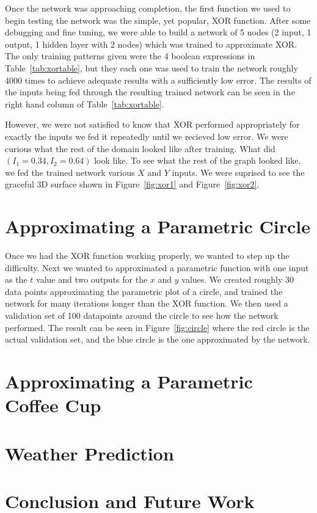 \documentclass{article}
\begin{document}
\begin{multicols}{2}
Once the network was approaching completion, the first function we used to begin testing the network was the simple, yet popular, XOR function. After some debugging and fine tuning, we were able to build a network of 5 nodes (2 input, 1 output, 1 hidden layer with 2 nodes) which was trained to approximate XOR. The only training patterns given were the 4 boolean expressions in Table~\ref{tab:xortable}, but they each one was used to train the network roughly 4000 times to achieve adequate results with a sufficiently low error. The results of the inputs being fed through the resulting trained network can be seen in the right hand column of Table~\ref{tab:xortable}.

However, we were not satisfied to know that XOR performed appropriately for exactly the inputs we fed it repeatedly until we recieved low error. We were curious what the rest of the domain looked like after training. What did $(I_1=0.34, I_2=0.64)$ look like. To see what the rest of the graph looked like, we fed the trained network various $X$ and $Y$ inputs. We were suprised to see the graceful 3D surface shown in Figure~\ref{fig:xor1} and Figure~\ref{fig:xor2}.

\section{Approximating a Parametric Circle}

Once we had the XOR function working properly, we wanted to step up the difficulty. Next we wanted to approximated a parametric function with one input as the $t$ value and two outputs for the $x$ and $y$ values. We created roughly 30 data points approximating the parametric plot of a circle, and trained the network for many iterations longer than the XOR function. We then used a validation set of 100 datapoints around the circle to see how the network performed. The result can be seen in Figure~\ref{fig:circle} where the red circle is the actual validation set, and the blue circle is the one approximated by the network.

\section{Approximating a Parametric Coffee Cup}

\section{Weather Prediction}

\section{Conclusion and Future Work}




\end{multicols}
\end{document}
